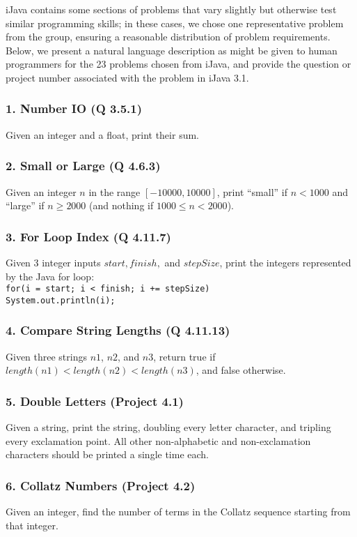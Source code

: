 \documentclass{sig-alternate}
\begin{document}
iJava contains some sections of problems that vary slightly but otherwise test similar programming skills; in these cases, we chose one representative problem from the group, ensuring a reasonable distribution of problem requirements. Below, we present a natural language description as might be given to human programmers for the 23 problems chosen from iJava, and provide the question or project number associated with the problem in iJava 3.1.


\subsubsection*{1. Number IO (Q 3.5.1)}
Given an integer and a float, print their sum.

\subsubsection*{2. Small or Large (Q 4.6.3)}
Given an integer $n$ in the range $[-10000, 10000]$, print ``small'' if $n < 1000$ and ``large'' if $n \ge 2000$ (and nothing if $1000 \le n < 2000$).

\subsubsection*{3. For Loop Index (Q 4.11.7)}
Given 3 integer inputs $start, finish,$ and $stepSize$, print the integers represented by the Java for loop: \\
\texttt{for(i = start; i < finish; i += stepSize) \\ \- \- \- \- System.out.println(i);}

\subsubsection*{4. Compare String Lengths (Q 4.11.13)}
Given three strings $n1$, $n2$, and $n3$, return true if $length(n1) < length(n2) < length(n3)$, and false otherwise.

\subsubsection*{5. Double Letters (Project 4.1)}
Given a string, print the string, doubling every letter character, and tripling every exclamation point. All other non-alphabetic and non-exclamation characters should be printed a single time each.

\subsubsection*{6. Collatz Numbers (Project 4.2)}
Given an integer, find the number of terms in the Collatz sequence starting from that integer.
\end{document}
